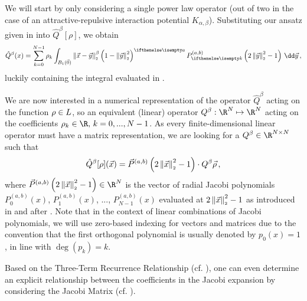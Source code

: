 We will start by only considering a single power law operator (out of two in the case of an attractive-repulsive interaction potential $K_{\alpha, \beta}$).
Substituting our ansatz given in  into $\hat{Q}^\beta[\rho]$, we obtain
\begin{equation}
  \hat{Q}^{\beta}(x) = \sum_{k=0}^{N-1} \rho_{k} \int_{B_1(\vec{0})} \norm{\vec{x}-\vec{y}}^{\beta} \weight{y}\jacobi{y} \,\dd\vec{y}\,,
  \label{eq:theorem216-in-derivation}
\end{equation}
luckily containing the integral evaluated in .

We are now interested in a numerical representation of the operator $\hat{Q}^\beta$ acting on the function $\rho \in L$, so an equivalent (linear) operator $Q^\beta: \R^N \mapsto \R^N$ acting on the coefficients $\rho_k \in \R,\, k = 0, ..., N-1$.
As every finite-dimensional linear operator must have a matrix representation, we are looking for a $Q^\beta \in \R^{N \times N}$ such that
$$\hat{Q}^\beta[\rho](\vec{x}) = \vec{P}^{(a, b)}\left(2 \left\lVert\vec{x}\right\rVert_{\scriptscriptstyle 2}^2 - 1\right) \cdot Q^\beta \vec{\rho}\,,$$
where $\jacobivec{x} \in \R^N$ is the vector of radial Jacobi polynomials $P^{(a, b)}_0(x)$, $P^{(a, b)}_1(x)$, ..., $P^{(a, b)}_{N-1}(x)$ evaluated at $2\left\lVert\vec{x}\right\rVert_{\scriptscriptstyle 2}^2 - 1$ as introduced in and after .
Note that in the context of linear combinations of Jacobi polynomials, we will use zero-based indexing for vectors and matrices due to the convention that the first orthogonal polynomial is usually denoted by $p_0(x) = 1$, in line with $\deg(p_k) = k$.

Based on the Three-Term Recurrence Relationship (cf. ), one can even determine an explicit relationship between the coefficients in the Jacobi expansion by considering the Jacobi Matrix (cf. ).

